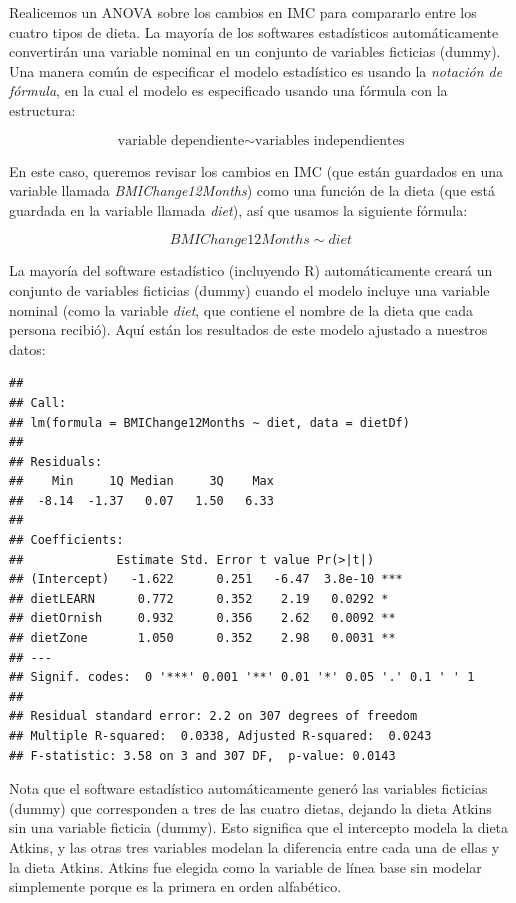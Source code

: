 \documentclass[
  12pt,
]{book}
\begin{document}
Realicemos un ANOVA sobre los cambios en IMC para compararlo entre los cuatro tipos de dieta. La mayoría de los softwares estadísticos automáticamente convertirán una variable nominal en un conjunto de variables ficticias (dummy). Una manera común de especificar el modelo estadístico es usando la \emph{notación de fórmula}, en la cual el modelo es especificado usando una fórmula con la estructura:

\[ 
\text{variable dependiente} \sim \text{variables independientes}
\]

En este caso, queremos revisar los cambios en IMC (que están guardados en una variable llamada \emph{BMIChange12Months}) como una función de la dieta (que está guardada en la variable llamada \emph{diet}), así que usamos la siguiente fórmula:

\[
BMIChange12Months \sim diet
\]

La mayoría del software estadístico (incluyendo R) automáticamente creará un conjunto de variables ficticias (dummy) cuando el modelo incluye una variable nominal (como la variable \emph{diet}, que contiene el nombre de la dieta que cada persona recibió). Aquí están los resultados de este modelo ajustado a nuestros datos:

\begin{verbatim}
## 
## Call:
## lm(formula = BMIChange12Months ~ diet, data = dietDf)
## 
## Residuals:
##    Min     1Q Median     3Q    Max 
##  -8.14  -1.37   0.07   1.50   6.33 
## 
## Coefficients:
##             Estimate Std. Error t value Pr(>|t|)    
## (Intercept)   -1.622      0.251   -6.47  3.8e-10 ***
## dietLEARN      0.772      0.352    2.19   0.0292 *  
## dietOrnish     0.932      0.356    2.62   0.0092 ** 
## dietZone       1.050      0.352    2.98   0.0031 ** 
## ---
## Signif. codes:  0 '***' 0.001 '**' 0.01 '*' 0.05 '.' 0.1 ' ' 1
## 
## Residual standard error: 2.2 on 307 degrees of freedom
## Multiple R-squared:  0.0338, Adjusted R-squared:  0.0243 
## F-statistic: 3.58 on 3 and 307 DF,  p-value: 0.0143
\end{verbatim}

Nota que el software estadístico automáticamente generó las variables ficticias (dummy) que corresponden a tres de las cuatro dietas, dejando la dieta Atkins sin una variable ficticia (dummy). Esto significa que el intercepto modela la dieta Atkins, y las otras tres variables modelan la diferencia entre cada una de ellas y la dieta Atkins. Atkins fue elegida como la variable de línea base sin modelar simplemente porque es la primera en orden alfabético.
\end{document}
